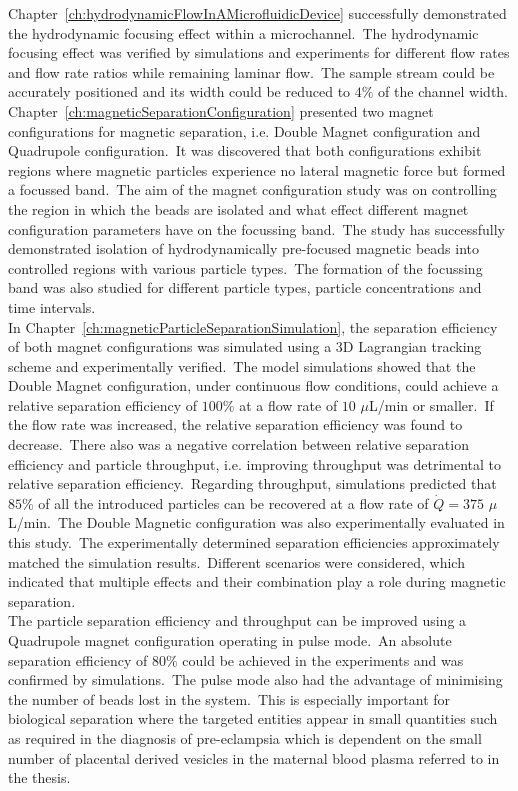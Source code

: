 Chapter~\ref{ch:hydrodynamicFlowInAMicrofluidicDevice} successfully demonstrated the hydrodynamic focusing effect within a microchannel.\ The hydrodynamic focusing effect was verified by simulations and experiments for different flow rates and flow rate ratios while remaining laminar flow.\ The sample stream could be accurately positioned and its width could be reduced to $4\%$ of the channel width.\\
Chapter~\ref{ch:magneticSeparationConfiguration} presented two magnet configurations for magnetic separation, i.e. Double Magnet configuration and Quadrupole configuration.\ It was discovered that both configurations exhibit regions where magnetic particles experience no lateral magnetic force but formed a focussed band.\ The aim of the magnet configuration study was on controlling the region in which the beads are isolated and what effect different magnet configuration parameters have on the focussing band.\ The study has successfully demonstrated isolation of hydrodynamically pre-focused magnetic beads into controlled regions with various particle types.\ The formation of the focussing band was also studied for different particle types, particle concentrations and time intervals.\\
In Chapter~\ref{ch:magneticParticleSeparationSimulation}, the separation efficiency of both magnet configurations was simulated using a 3D Lagrangian tracking scheme and experimentally verified.\ The model simulations showed that the Double Magnet configuration, under continuous flow conditions, could achieve a relative separation efficiency of $100\%$ at a flow rate of $10$ $\mu$L/min or smaller.\ If the flow rate was increased, the relative separation efficiency was found to decrease.\ There also was a negative correlation between relative separation efficiency and particle throughput, i.e. improving throughput was detrimental to relative separation efficiency.\ Regarding throughput, simulations predicted that $85\%$ of all the introduced particles can be recovered at a flow rate of $\dot{Q}=375$ $\mu$L/min.\ The Double Magnetic configuration was also experimentally evaluated in this study.\ The experimentally determined separation efficiencies approximately matched the simulation results.\ Different scenarios were considered, which indicated that multiple effects and their combination play a role during magnetic separation.\\
The particle separation efficiency and throughput can be improved using a Quadrupole magnet configuration operating in pulse mode.\ An absolute separation efficiency of $80\%$ could be achieved in the experiments and was confirmed by simulations.\ The pulse mode also had the advantage of minimising the number of beads lost in the system.\ This is especially important for biological separation where the targeted entities appear in small quantities such as required in the diagnosis of pre-eclampsia which is dependent on the small number of placental derived vesicles in the maternal blood plasma referred to in the thesis.\\
